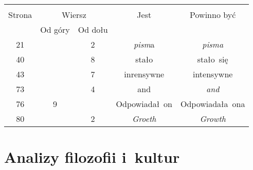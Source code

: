 \documentclass[a4paper,11pt]{article}
\begin{document}
\begin{center}

  \begin{tabular}{|c|c|c|c|c|}
    \hline
    & \multicolumn{2}{c|}{} & & \\
    Strona & \multicolumn{2}{c|}{Wiersz} & Jest
                              & Powinno być \\ \cline{2-3}
    & Od góry & Od dołu & & \\
    \hline
    21  & &  2 & \textit{pism}a & \textit{pisma} \\
    40  & &  8 & stało & stało~się \\
    43  & &  7 & inrensywne & intensywne \\
    73  & &  4 & and & \textit{and} \\
    76  &  9 & & Odpowiadał~on & Odpowiadała~ona \\
    80  & &  2 & \textit{Groeth} & \textit{Growth} \\
    \hline
  \end{tabular}

\end{center}


\vspace{\spaceTwo}










\newpage
\section{Analizy filozofii i~kultur}

\vspace{\spaceTwo}



\end{document}
